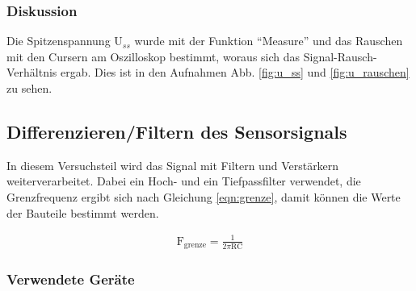 \documentclass[12pt,a4paper]{article}
\begin{document}
\subsubsection*{Diskussion}
Die Spitzenspannung U$_{ss}$ wurde mit der Funktion "`Measure"' und das Rauschen mit den Cursern am Oszilloskop bestimmt, woraus sich das Signal-Rausch-Verhältnis ergab. Dies ist in den Aufnahmen Abb. \ref{fig:u_ss} und \ref{fig:u_rauschen} zu sehen. 
\subsection{Differenzieren/Filtern des Sensorsignals}
In diesem Versuchsteil wird das Signal mit Filtern und Verstärkern weiterverarbeitet. Dabei ein Hoch- und ein Tiefpassfilter verwendet, die Grenzfrequenz ergibt sich nach Gleichung \ref{eqn:grenze}, damit können die Werte der Bauteile bestimmt werden.

\begin{align}
\text{F}_\text{grenze}=\frac{1}{2 \pi \text{RC}}
\label{eqn:grenze}
\end{align}
\subsubsection*{Verwendete Geräte}
\end{document}

